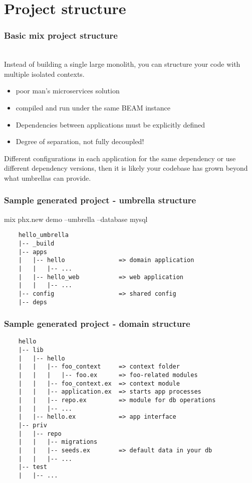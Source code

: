 \section{Project structure}

\frame{\tableofcontents[currentsection]}

\begin{frame}
    \frametitle{Basic mix project structure}   
     \\
    Instead of building a single large monolith, you can structure your code with multiple isolated contexts.
    \begin{itemize}
        \item poor man’s microservices solution
        \item compiled and run under the same BEAM instance
        \item Dependencies between applications must be explicitly defined
        \item Degree of separation, not fully decoupled!
    \end{itemize}
    \vfill
    \small
    Different configurations in each application for the same dependency or use different dependency versions, then it is likely your codebase has grown beyond what umbrellas can provide.
\end{frame}

\begin{frame}[fragile]
    \frametitle{Sample generated project - umbrella structure}   
    mix phx.new demo --umbrella --database mysql
    \vfill
    \begin{verbatim}
    hello_umbrella
    |-- _build
    |-- apps
    |   |-- hello               => domain application
    |   |   |-- ...
    |   |-- hello_web           => web application
    |   |   |-- ...
    |-- config                  => shared config
    |-- deps
    \end{verbatim} 
\end{frame}

\begin{frame}[fragile]
    \frametitle{Sample generated project - domain structure}
    \begin{verbatim}
    hello
    |-- lib
    |   |-- hello
    |   |   |-- foo_context     => context folder
    |   |   |   |-- foo.ex      => foo-related modules
    |   |   |-- foo_context.ex  => context module
    |   |   |-- application.ex  => starts app processes
    |   |   |-- repo.ex         => module for db operations
    |   |   |-- ...
    |   |-- hello.ex            => app interface
    |-- priv
    |   |-- repo
    |   |   |-- migrations
    |   |   |-- seeds.ex        => default data in your db
    |   |   |-- ...
    |-- test
    |   |-- ...
\end{verbatim} 
\end{frame}

